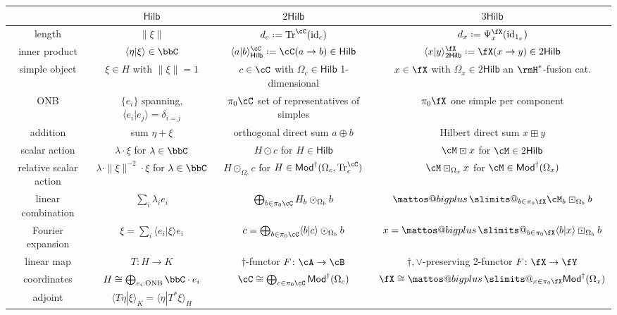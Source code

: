 \documentclass[12pt, reqno]{amsart}
\makeatletter
\DeclareMathOperator{\id}{id}
\DeclareMathOperator{\Tr}{Tr}
\newcommand{\Mod}{\mathsf{Mod}}
\newcommand{\Hilb}{\mathsf{Hilb}}
\theoremstyle{plain}
\theoremstyle{definition}
\newcommand{\coloneq}{:=}
\def\coloneq{\mathrel{\vcenter{\baselineskip0.55ex\lineskiplimit0pt\hbox{\upshape.}\hbox{\upshape.}}}=}
\newcommand{\bigboxplus}{%
  \DOTSB\mathop{\mathpalette\mattos@bigplus\relax}\slimits@
}
\newcommand\mattos@bigplus[2]{%
  \vcenter{\hbox{%
    \sbox\z@{$#1\sum$}%
    \resizebox{!}{0.9\dimexpr\ht\z@+\dp\z@}{\raisebox{\depth}{$\m@th#1\boxplus$}}%
  }}%
  \vphantom{\sum}%
}
\makeatother
\begin{document}
\begin{landscape}
\thispagestyle{empty}    
\begin{table}
\hspace*{-1.5cm}
\begin{tabular}{|c||c|c|c|}
\hline
& $\Hilb$ & $2\Hilb$ & $3\Hilb$
\\\hline\hline
length
&
$\|\xi\|$
&
$d_c\coloneq\Tr^\cC(\id_c)$
&
$d_x\coloneq \Psi^\fX_x(\id_{1_x})$
\\\hline
inner product
&
$\langle \eta|\xi\rangle\in \bbC$
&
$\langle a|b\rangle_\Hilb^\cC\coloneq \cC(a\to b)\in \Hilb$
&
$\langle x|y\rangle^\fX_{2\Hilb}\coloneq \fX(x\to y)\in 2\Hilb$
\\\hline
simple object
&
$\xi\in H$ with $\|\xi\|=1$
&
$c\in \cC$ 
with $\Omega_c\in \Hilb$ 1-dimensional
& 
$x\in \fX$ 
with $\Omega_x\in 2\Hilb$ an $\rmH^*$-fusion cat.
\\\hline
ONB
&
$\{e_i\}$
spanning, $\langle e_i|e_j\rangle=\delta_{i=j}$
&
$\pi_0\cC$
set of representatives of simples
&
$\pi_0\fX$
one simple per component
\\\hline
addition
&
sum $\eta+\xi$
&
orthogonal direct sum $a\oplus b$
&
Hilbert direct sum $x\boxplus y$
\\\hline
scalar action
&
$\lambda\cdot \xi$ for $\lambda\in\bbC$
&
$H\odot c$
for $H\in \Hilb$
&
$\cM\boxdot x$
for $\cM\in 2\Hilb$
\\\hline
relative scalar action
&
$\lambda\cdot \|\xi\|^{-2} \cdot\xi$ for $\lambda\in \bbC$
&
$H\odot_{\Omega_c} c$
for $H\in \Mod^\dag(\Omega_c,\Tr^\cC_c)$
&
$\cM\boxdot_{\Omega_x} x$
for $\cM\in \Mod^\dag(\Omega_x)$
\\\hline
linear combination
&
$\sum_i \lambda_i e_i$
&
$\bigoplus_{b\in \pi_0\cC} H_b\odot_{\Omega_b} b$
&
$\bigboxplus_{b\in \pi_0\fX} \cM_b \boxdot_{\Omega_b} b$
\\\hline
Fourier expansion
&
$\xi = \sum_i \langle e_i|\xi\rangle e_i$
&
$c=\bigoplus_{b\in \pi_0\cC} \langle b|c\rangle \odot_{\Omega_b} b$
&
$x=\bigboxplus_{b\in \pi_0\fX} \langle b|x\rangle \boxdot_{\Omega_b} b$
\\\hline
linear map
&
$T\colon H\to K$
&
$\dag$-functor $F\colon  \cA\to \cB$
&
$\dag,\vee$-preserving 2-functor $F\colon \fX\to \fY$
\\\hline
coordinates
&
$H \cong \bigoplus_{e_i:\text{ONB}} \bbC \cdot e_i$
&
$\cC \cong \bigoplus_{c \in \pi_0\cC} \Mod^\dag(\Omega_c)$
&
$\fX \cong \bigboxplus_{x \in \pi_0\fX} \Mod^\dag(\Omega_x)$
\\\hline
adjoint
&
$\langle T\eta |\xi\rangle_K=\langle \eta| T^*\xi\rangle_H$

\end{tabular}
\end{table}
\end{landscape}
\end{document}

